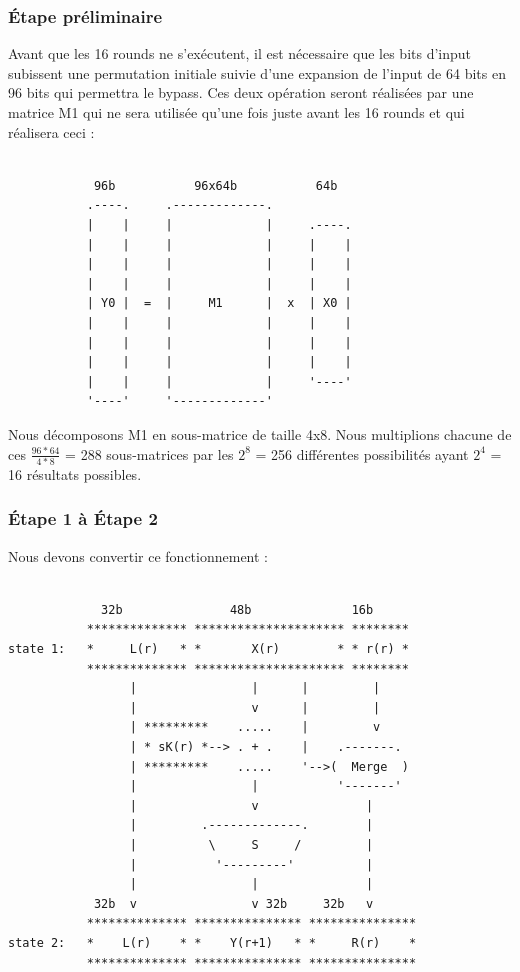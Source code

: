 \documentclass[a4paper,12pt]{article}
\begin{document}
\subsubsection{Étape préliminaire}

Avant que les 16 rounds ne s'exécutent, il est nécessaire que les bits d'input subissent une permutation initiale suivie d'une expansion de l'input de 64 bits en 96 bits qui permettra le bypass.
Ces deux opération seront réalisées par une matrice M1 qui ne sera utilisée qu'une fois juste avant les 16 rounds et qui réalisera ceci :

\begin{Verbatim}[samepage=true]

            96b           96x64b           64b
           .----.     .-------------. 
           |    |     |             |     .----.
           |    |     |             |     |    |
           |    |     |             |     |    |
           |    |     |             |     |    |
           | Y0 |  =  |     M1      |  x  | X0 |
           |    |     |             |     |    |
           |    |     |             |     |    |
           |    |     |             |     |    |
           |    |     |             |     '----'
           '----'     '-------------'

\end{Verbatim}


Nous décomposons M1 en sous-matrice de taille 4x8. Nous multiplions chacune de ces $\frac{96*64}{4*8}$ = 288 sous-matrices par les $2^8$ = 256 différentes possibilités ayant $2^4$ = 16 résultats possibles.


\subsubsection{Étape 1 à Étape 2}

Nous devons convertir ce fonctionnement :

\begin{Verbatim}[samepage=true]
			
             32b               48b              16b
           ************** ********************* ********
state 1:   *     L(r)   * *       X(r)        * * r(r) *
           ************** ********************* ********
                 |                |      |         |
                 |                v      |         |
                 | *********    .....    |         v
                 | * sK(r) *--> . + .    |    .-------.
                 | *********    .....    '-->(  Merge  )
                 |                |           '-------'
                 |                v               |
                 |         .-------------.        |
                 |          \     S     /         |
                 |           '---------'          |
                 |                |               |
            32b  v                v 32b     32b   v
           ************** *************** ***************
state 2:   *    L(r)    * *    Y(r+1)   * *     R(r)    *
           ************** *************** ***************

\end{Verbatim}		
\end{document}
